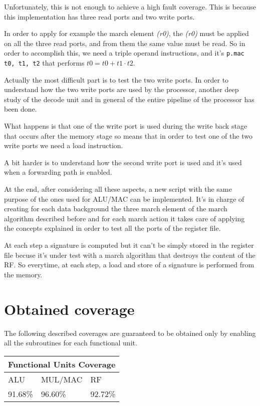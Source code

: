 \documentclass[paper=a4, fontsize=10pt]{scrartcl}	%
\begin{document}
	Unfortunately, this is not enough to achieve a high fault coverage. This is because this implementation has three read ports and two write ports. 
	
	In order to apply for example the march element \textit{(r0)}, the \textit{(r0)} must be applied on all the three read ports, and from them the same value must be read. So in order to accomplish this, we need a triple operand instructions, and it's \texttt{p.mac t0, t1, t2} that performs $t0 = t0 + t1 \cdot t2$.\newline

	Actually the most difficult part is to test the two write ports. In order to understand how the two write ports are used by the processor, another deep study of the decode unit and in general of the entire pipeline of the processor has been done. 
	
	What happens is that one of the write port is used during the write back stage that occurs after the memory stage so means that in order to test one of the two write ports we need a load instruction. 

	A bit harder is to understand how the second write port is used and it's used when a forwarding path is enabled. \newline

	At the end, after considering all these aspects, a new script with the same purpose of the ones used for ALU/MAC can be implemented. It's in charge of creating for each data background the three march element of the march algorithm described before and for each march action it takes care of applying the concepts explained in order to test all the ports of the register file. \newline

	At each step a signature is computed but it can't be simply stored in the register file becuse it's under test with a march algorithm that destroys the content of the RF. So everytime, at each step, a load and store of a signature is performed from the memory.


	\section{Obtained coverage}

	The following described coverages are guaranteed to be obtained only by enabling all the subroutines for each functional unit.

	\begin{center}
		\begin{tabular}{ |p{3cm}|p{3cm}|p{3cm}|  }
			\hline
			\multicolumn{3}{|c|}{Functional Units Coverage} \\
			\hline
			ALU&MUL/MAC&RF\\
			\hline
			91.68\%&96.60\%&92.72\%\\
			\hline
		\end{tabular}
	\end{center}
\end{document}
